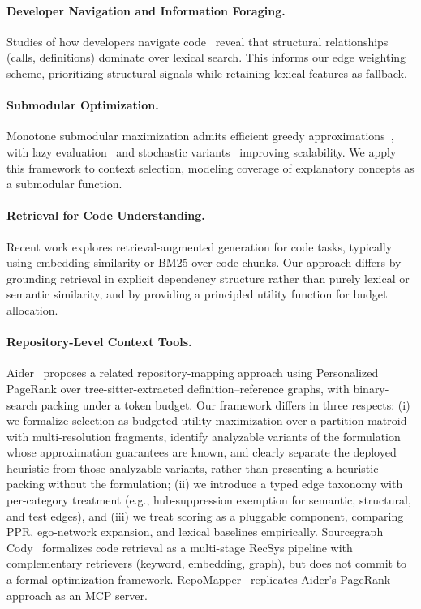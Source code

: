 \documentclass[11pt, a4paper]{article}
\begin{document}
\paragraph{Developer Navigation and Information Foraging.}
Studies of how developers navigate code~\cite{ko2006exploratory, robillard2004effective} reveal that structural relationships (calls, definitions) dominate over lexical search. This informs our edge weighting scheme, prioritizing structural signals while retaining lexical features as fallback.

\paragraph{Submodular Optimization.}
Monotone submodular maximization admits efficient greedy approximations~\cite{nemhauser1978analysis}, with lazy evaluation~\cite{minoux1978accelerated} and stochastic variants~\cite{mirzasoleiman2015lazier} improving scalability. We apply this framework to context selection, modeling coverage of explanatory concepts as a submodular function.

\paragraph{Retrieval for Code Understanding.}
Recent work explores retrieval-augmented generation for code tasks, typically using embedding similarity or BM25 over code chunks. Our approach differs by grounding retrieval in explicit dependency structure rather than purely lexical or semantic similarity, and by providing a principled utility function for budget allocation.

\paragraph{Repository-Level Context Tools.}
Aider~\cite{aider2023repomap} proposes a related repository-mapping approach using Personalized PageRank over tree-sitter-extracted definition--reference graphs, with binary-search packing under a token budget. Our framework differs in three respects: (i) we formalize selection as budgeted utility maximization over a partition matroid with multi-resolution fragments, identify analyzable variants of the formulation whose approximation guarantees are known, and clearly separate the deployed heuristic from those analyzable variants, rather than presenting a heuristic packing without the formulation; (ii) we introduce a typed edge taxonomy with per-category treatment (e.g., hub-suppression exemption for semantic, structural, and test edges), and (iii) we treat scoring as a pluggable component, comparing PPR, ego-network expansion, and lexical baselines empirically. Sourcegraph Cody~\cite{hartman2024recsys} formalizes code retrieval as a multi-stage RecSys pipeline with complementary retrievers (keyword, embedding, graph), but does not commit to a formal optimization framework. RepoMapper~\cite{repomapper2024} replicates Aider's PageRank approach as an MCP server.
\end{document}
